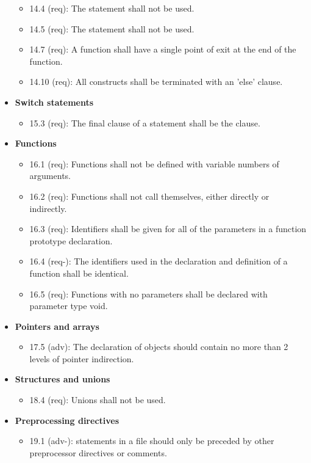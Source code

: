 \begin{itemize}
\begin{itemize}
\item 14.4 (req): The  statement shall not be used.
\item 14.5 (req): The  statement shall not be used.
\item 14.7 (req): A function shall have a single point of exit at the end of the function.
\item 14.10 (req): All  constructs shall be terminated with an 'else' clause.
\end{itemize}
\item \textbf{Switch statements}
\begin{itemize}
\item 15.3 (req): The final clause of a  statement shall be the 
 clause.
\end{itemize}
\item \textbf{Functions}
\begin{itemize}
\item 16.1 (req): Functions shall not be defined with variable numbers of arguments.
\item 16.2 (req): Functions shall not call themselves, either directly or indirectly.
\item 16.3 (req): Identifiers shall be given for all of the parameters in a function prototype declaration.
\item 16.4 (req-): The identifiers used in the declaration and definition of a function shall be identical.
\item 16.5 (req): Functions with no parameters shall be declared with parameter type void.
\end{itemize}
\item \textbf{Pointers and arrays}
\begin{itemize}
\item 17.5 (adv): The declaration of objects should contain no more than 2 levels of pointer indirection.
\end{itemize}
\item \textbf{Structures and unions}
\begin{itemize}
\item 18.4 (req): Unions shall not be used.
\end{itemize}
\item \textbf{Preprocessing directives}
\begin{itemize}
\item 19.1 (adv-):  statements in a file should only be preceded by other preprocessor directives or comments.

\end{itemize}
\end{itemize}
